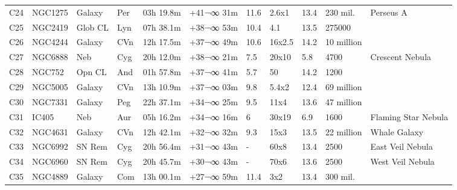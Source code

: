 \documentclass[10pt,twoside,a4paper,english]{report}
\begin{document}
\begin{longtable}{@{}lllllllllll@{}}
C24        & NGC1275     & Galaxy     & Per       & 03h 19.8m & +41¬∞ 31m  & 11.6      & 2.6x1                & 13.4     & 230 mil.            & Perseus A                       \\ 
C25        & NGC2419     & Glob CL    & Lyn       & 07h 38.1m & +38¬∞ 53m  & 10.4      & 4.1                  & 13.5     & 275000              &                                 \\ 
C26        & NGC4244     & Galaxy     & CVn       & 12h 17.5m & +37¬∞ 49m  & 10.6      & 16x2.5               & 14.2     & 10 million          &                                 \\ 
C27        & NGC6888     & Neb        & Cyg       & 20h 12.0m & +38¬∞ 21m  & 7.5       & 20x10                & 5.8      & 4700                & Crescent Nebula                 \\ 
C28        & NGC752      & Opn CL     & And       & 01h 57.8m & +37¬∞ 41m  & 5.7       & 50                   & 14.2     & 1200                &                                 \\ 
C29        & NGC5005     & Galaxy     & CVn       & 13h 10.9m & +37¬∞ 03m  & 9.8       & 5.4x2                & 12.4     & 69 million          &                                 \\ 
C30        & NGC7331     & Galaxy     & Peg       & 22h 37.1m & +34¬∞ 25m  & 9.5       & 11x4                 & 13.6     & 47 million          &                                 \\ 
C31        & IC405       & Neb        & Aur       & 05h 16.2m & +34¬∞ 16m  & 6         & 30x19                & 6.9      & 1600                & Flaming Star Nebula             \\ 
C32        & NGC4631     & Galaxy     & CVn       & 12h 42.1m & +32¬∞ 32m  & 9.3       & 15x3                 & 13.5     & 22 million          & Whale Galaxy                    \\ 
C33        & NGC6992    & SN Rem     & Cyg       & 20h 56.4m & +31¬∞ 43m  & -         & 60x8                 & 13.4     & 2500                & East Veil Nebula                \\ 
C34        & NGC6960     & SN Rem     & Cyg       & 20h 45.7m & +30¬∞ 43m  & -         & 70x6                 & 13.6     & 2500                & West Veil Nebula                \\ 
C35        & NGC4889     & Galaxy     & Com       & 13h 00.1m & +27¬∞ 59m  & 11.4      & 3x2                  & 13.4     & 300 mil.            &                                 \\ 

\end{longtable}
\end{document}
